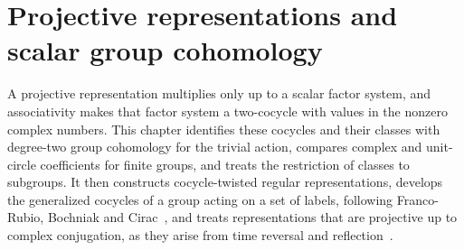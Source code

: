 \chapter{Projective representations and scalar group cohomology}
\label{ch:projective_cohomology}

A projective representation multiplies only up to a scalar factor system, and
associativity makes that factor system a two-cocycle with values in the
nonzero complex numbers. This chapter identifies these cocycles and their
classes with degree-two group cohomology for the trivial action, compares
complex and unit-circle coefficients for finite groups, and treats the
restriction of classes to subgroups. It then constructs cocycle-twisted
regular representations, develops the generalized cocycles of a group acting
on a set of labels, following Franco-Rubio, Bochniak and
Cirac~\cite{FrancoRubio2025MPUGauging}, and treats representations that are
projective up to complex conjugation, as they arise from time reversal and
reflection~\cite{Cirac2021Matrix}.






